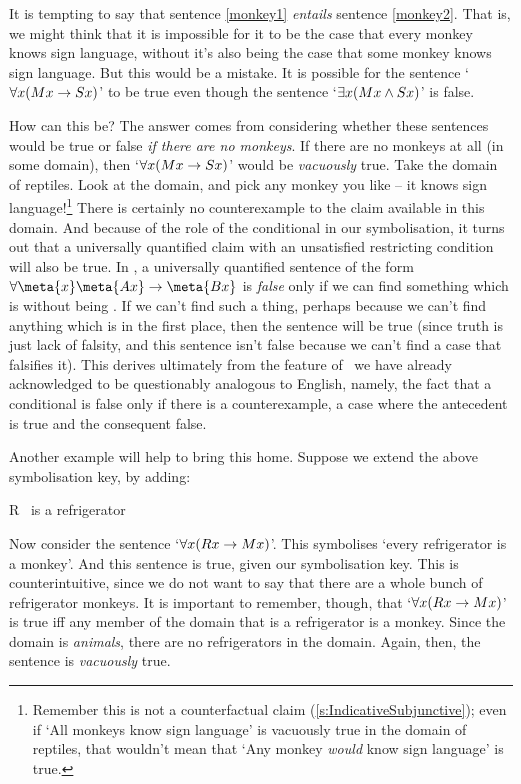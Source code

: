 It is tempting to say that sentence \ref{monkey1} \emph{entails} sentence \ref{monkey2}. That is, we might think that it is impossible for it to be the case that every monkey knows sign language, without it's also being the case that some monkey knows sign language.  But this would be a mistake. It is possible for the sentence `$\forall x(Mx \rightarrow Sx)$' to be true even though the sentence `$\exists x(Mx \wedge Sx)$' is false.

How can this be? The answer comes from considering whether these sentences would be true or false \emph{if there are no monkeys}. If there are no monkeys at all (in some domain), then `$\forall x(Mx \rightarrow Sx)$' would be \emph{vacuously} true. Take the domain of reptiles. Look at the domain, and pick any monkey you like – it knows sign language!\footnote{Remember this is not a counterfactual claim (\ref{s:IndicativeSubjunctive}); even if `All monkeys know sign language' is vacuously true in the domain of reptiles, that wouldn't mean that `Any monkey \emph{would} know sign language' is true.} There is certainly no counterexample to the claim available in this domain. And because of the role of the conditional in our symbolisation, it turns out that a universally quantified claim with an unsatisfied restricting condition will also be true. In \FOL, a universally quantified sentence of the form $\forall \meta{x} \meta{Ax} \eif \meta{Bx}$ is \emph{false} only if we can find something which is  without being . If we can't find such a thing, perhaps because we can't find anything which is  in the first place, then the sentence will be true (since truth is just lack of falsity, and this sentence isn't false because we can't find a case that falsifies it). This derives ultimately from the feature of \TFL\ we have already acknowledged to be questionably analogous to English, namely, the fact that a conditional is false only if there is a counterexample, a case where the antecedent is true and the consequent false.

Another example will help to bring this home. Suppose we extend the above symbolisation key, by adding:
	\begin{ekey}
		\item[R] \blank\ is a refrigerator
	\end{ekey}
Now consider the sentence `$\forall x(Rx \rightarrow Mx)$'. This symbolises `every refrigerator is a monkey'. And this sentence is true, given our symbolisation key. This is counterintuitive, since we do not want to say that there are a whole bunch of refrigerator monkeys. It is important to remember, though, that `$\forall x(Rx \rightarrow Mx)$' is true iff any member of the domain that is a refrigerator is a monkey. Since the domain is \emph{animals}, there are no refrigerators in the domain. Again, then, the sentence is \emph{vacuously} true. 

